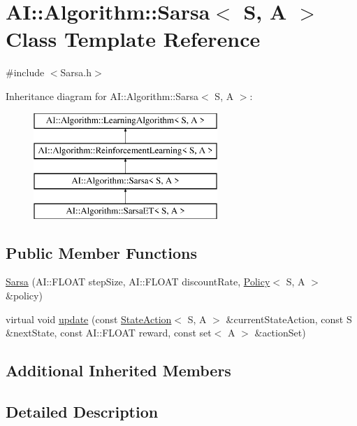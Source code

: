 \hypertarget{classAI_1_1Algorithm_1_1Sarsa}{\section{A\-I\-:\-:Algorithm\-:\-:Sarsa$<$ S, A $>$ Class Template Reference}
\label{classAI_1_1Algorithm_1_1Sarsa}
}


{\ttfamily \#include $<$Sarsa.\-h$>$}

Inheritance diagram for A\-I\-:\-:Algorithm\-:\-:Sarsa$<$ S, A $>$\-:\begin{figure}[H]
\begin{center}
\leavevmode
\includegraphics[height=4.000000cm]{classAI_1_1Algorithm_1_1Sarsa}
\end{center}
\end{figure}
\subsection*{Public Member Functions}
\begin{DoxyCompactItemize}
\item 
\hyperlink{classAI_1_1Algorithm_1_1Sarsa_afbf9b70589b234a07f4516aecd359fda}{Sarsa} (A\-I\-::\-F\-L\-O\-A\-T step\-Size, A\-I\-::\-F\-L\-O\-A\-T discount\-Rate, \hyperlink{classAI_1_1Algorithm_1_1Policy}{Policy}$<$ S, A $>$ \&policy)
\item 
virtual void \hyperlink{classAI_1_1Algorithm_1_1Sarsa_ae1d62478d3e31cace3fb594e05f83d1c}{update} (const \hyperlink{classAI_1_1StateAction}{State\-Action}$<$ S, A $>$ \&current\-State\-Action, const S \&next\-State, const A\-I\-::\-F\-L\-O\-A\-T reward, const set$<$ A $>$ \&action\-Set)
\end{DoxyCompactItemize}
\subsection*{Additional Inherited Members}


\subsection{Detailed Description}
